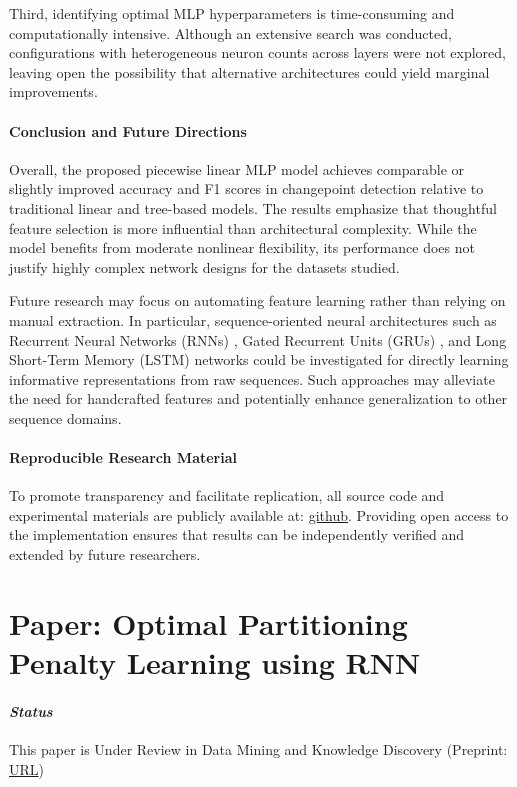 \documentclass[12pt]{article}
\begin{document}
Third, identifying optimal MLP hyperparameters is time-consuming and computationally intensive. Although an extensive search was conducted, configurations with heterogeneous neuron counts across layers were not explored, leaving open the possibility that alternative architectures could yield marginal improvements.

\paragraph{Conclusion and Future Directions}

Overall, the proposed piecewise linear MLP model achieves comparable or slightly improved accuracy and F1 scores in changepoint detection relative to traditional linear and tree-based models. The results emphasize that thoughtful feature selection is more influential than architectural complexity. While the model benefits from moderate nonlinear flexibility, its performance does not justify highly complex network designs for the datasets studied.

Future research may focus on automating feature learning rather than relying on manual extraction. In particular, sequence-oriented neural architectures such as Recurrent Neural Networks (RNNs) \citep{rnn}, Gated Recurrent Units (GRUs) \citep{gru}, and Long Short-Term Memory (LSTM) networks \citep{lstm} could be investigated for directly learning informative representations from raw sequences. Such approaches may alleviate the need for handcrafted features and potentially enhance generalization to other sequence domains.

\paragraph{Reproducible Research Material}

To promote transparency and facilitate replication, all source code and experimental materials are publicly available at: \href{https://github.com/lamtung16/ML_ChangepointDetection}{github}. Providing open access to the implementation ensures that results can be independently verified and extended by future researchers.


\newpage

\section{Paper: Optimal Partitioning Penalty Learning using RNN}
\paragraph{\textit{Status}} This paper is Under Review in Data Mining and Knowledge Discovery (Preprint: \href{https://arxiv.org/abs/2505.07413}{URL})
\end{document}
